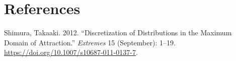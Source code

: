 \documentclass[
  10pt,
  a4paper,
]{scrreprt}
\newlength{\cslhangindent}
\newlength{\cslentryspacingunit} %
\newenvironment{CSLReferences}[2] %
 {%
  \setlength{\parindent}{0pt}
  \ifodd #1
  \let\oldpar\par
  \def\par{\hangindent=\cslhangindent\oldpar}
  \fi
  \setlength{\parskip}{#2\cslentryspacingunit}
 }%
 {}
\theoremstyle{definition}
\theoremstyle{plain}
\theoremstyle{remark}
\begin{document}
{\newpage{}

\hypertarget{references}{%
\chapter*{References}\label{references}}

\hypertarget{refs}{}
\begin{CSLReferences}{1}{0}
\leavevmode{}%
Shimura, Takaaki. 2012. {``Discretization of Distributions in the
Maximum Domain of Attraction.''} \emph{Extremes} 15 (September): 1--19.
\url{https://doi.org/10.1007/s10687-011-0137-7}.

\end{CSLReferences}
\end{document}
